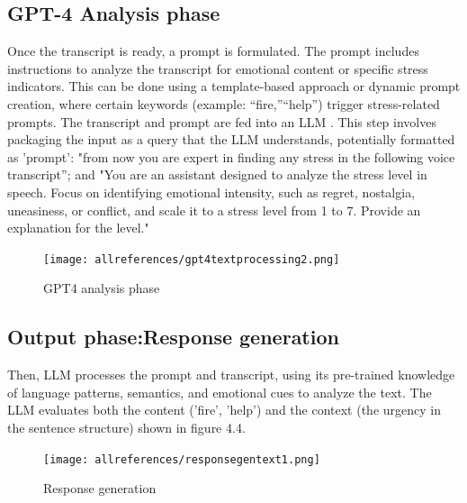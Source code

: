 \documentclass[Arial,12pt,openright,twoside]{book}
\begin{document}
\begin{enumerate}
\subsection{GPT-4 Analysis phase}
Once the transcript is ready, a prompt is formulated. The prompt includes instructions to analyze the transcript for emotional content or specific stress indicators. This can be done using a template-based approach or dynamic prompt creation, where certain keywords (example: “fire,”“help”) trigger stress-related prompts. The transcript and prompt are fed into an LLM . This step involves packaging the input as a query that the LLM understands, potentially formatted as 'prompt': "from now you are expert in finding any stress in the following voice transcript”; and "You are an assistant designed to analyze the stress level in speech. Focus on identifying emotional intensity, such as regret, nostalgia, uneasiness, or conflict, and scale it to a stress level from 1 to 7. Provide an explanation for the level."
\vspace{10pt} %
 \begin{figure}[htbp!]  %
    \centering
    \texttt{[image: allreferences/gpt4textprocessing2.png]}
    \caption{GPT4 analysis phase}
    \label{fig:system_architecture}
\end{figure}
\vspace{10pt} %
\subsection{Output phase:Response generation} %
Then, LLM processes the prompt and transcript, using its pre-trained knowledge of language patterns, semantics, and emotional cues to analyze the text. The LLM evaluates both the content ('fire', 'help') and the context (the urgency in the sentence structure) shown in figure 4.4.
\vspace{10pt} %
 \begin{figure}[htbp!] %
    \centering
    \texttt{[image: allreferences/responsegentext1.png]}
    \caption{Response generation}
    \label{fig:system_architecture}
\end{figure}
\vspace{10pt} %
\end{enumerate}
\end{document}
